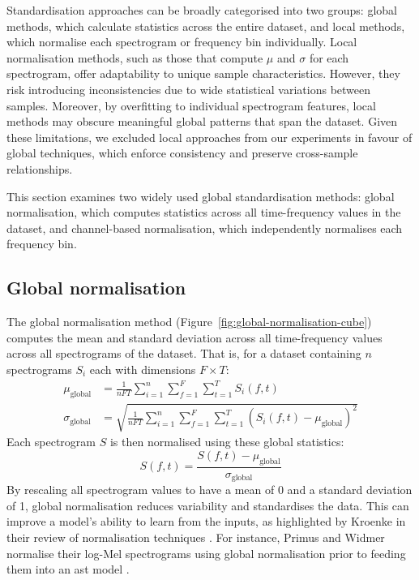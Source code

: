 Standardisation approaches can be broadly categorised into two groups: global methods, which calculate statistics across the entire dataset, and local methods, which normalise each spectrogram or frequency bin individually. Local normalisation methods, such as those that compute $\mu$ and $\sigma$ for each spectrogram, offer adaptability to unique sample characteristics. However, they risk introducing inconsistencies due to wide statistical variations between samples. Moreover, by overfitting to individual spectrogram features, local methods may obscure meaningful global patterns that span the dataset. Given these limitations, we excluded local approaches from our experiments in favour of global techniques, which enforce consistency and preserve cross-sample relationships.

This section examines two widely used global standardisation methods: global normalisation, which computes statistics across all time-frequency values in the dataset, and channel-based normalisation, which independently normalises each frequency bin. 



\subsection{Global normalisation}
The global normalisation method (Figure~\ref{fig:global-normalisation-cube}) computes the mean and standard deviation across all time-frequency values across all spectrograms of the dataset. That is, for a dataset containing $n$ spectrograms $S_i$ each with dimensions $F \times T$:
\begin{align}
    \mu_\text{global} &= \frac{1}{nFT} \sum_{i=1}^n \sum_{f=1}^F \sum_{t=1}^T S_i(f, t)\\
    \sigma_\text{global} &= \sqrt{\frac{1}{nFT} \sum_{i=1}^n \sum_{f=1}^F \sum_{t=1}^T \left(S_i(f, t) - \mu_\text{global}\right)^2}
\end{align} 
Each spectrogram $S$ is then normalised using these global statistics:
\begin{equation}
    S(f,t) = \frac{S(f,t) - \mu_{\text{global}}}{\sigma_{\text{global}}}
\end{equation}
By rescaling all spectrogram values to have a mean of 0 and a standard deviation of 1, global normalisation reduces variability and standardises the data. This can improve a model's ability to learn from the inputs, as highlighted by Kroenke in their review of normalisation techniques \cite{chris_kroenke_normalizing_2022}. For instance, Primus and Widmer normalise their log-Mel spectrograms using global normalisation prior to feeding them into an \acrlong{ast} model \cite{primus_frequency-wise_2023}.

